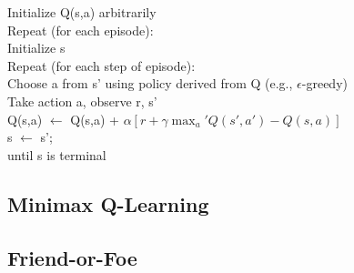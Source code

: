 \documentclass{article}
\newcommand{\tab}{\hspace{10mm}}
\newcommand{\dtab}{\hspace{20mm}}
\begin{document}
\begin{center} 
\begin{mdframed}
\begin{algorithm}[H]
Initialize Q(s,a) arbitrarily \\
Repeat (for each episode):\\
\tab Initialize s \\
\tab Repeat (for each step of episode):\\
\dtab Choose a from s' using policy derived from Q (e.g., $\epsilon$-greedy)\\
\dtab Take action a, observe r, s'\\
\dtab Q(s,a) $\leftarrow$ Q(s,a) + $\alpha [ r + \gamma \max_a' Q(s', a') - Q(s, a) ]$  \\
\dtab s $\leftarrow$ s'; \\
\tab until s is terminal\\
\end{algorithm}
\end{mdframed}
\label{alg:qlearning}
\end{center}





\subsection{Minimax Q-Learning} 




\begin{comment}
Initialize:
For all s in S, a in A, and o in O,
Let Q[s,a,o] := 1
For all s in S,
Let V[s] := 1
For all s in S, a in A,
Let pi[s,a] := 1/|A|
Let alpha := 1.0
Choose an action:
With probability explor, return an action uniformly at random.
Otherwise, if current state is s,
Return action a with probability pi[s,a].
Learn:
After receiving reward rew for moving from state s to s’
via action a and opponent’s action o,
Let Q[s,a,o] := (1-alpha) * Q[s,a,o] + alpha * (rew + gamma * V[s’])
Use linear programming to find pi[s,.] such that:
pi[s,.] := argmaxfpi’[s,.], minfo’, sumfa’, pi[s,a’] * Q[s,a’,o’]ggg
Let V[s] := minfo’, sumfa’, pi[s,a’] * Q[s,a’,o’]gg
Let alpha := alpha * decay
\end{comment}


\subsection{Friend-or-Foe}

\end{document}
